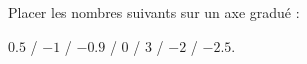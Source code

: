 
\begin{exercice}\label{exo2smath-0141}

    Placer les nombres suivants sur un axe gradué : 
    \begin{center}
        \( 0.5\) / \( -1\) / \( -0.9\) / \( 0\) / \( 3\) / \( -2\) / \( -2.5\).
    \end{center}

\end{exercice}
